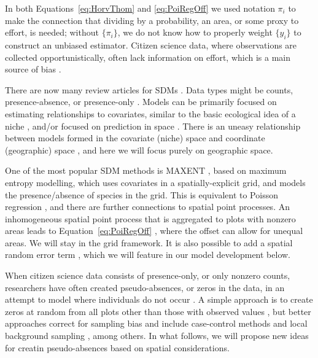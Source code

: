 \documentclass[11pt, titlepage]{article}
\begin{document}
\begin{spacing}{1.9}
\begin{flushleft}
In both Equations~\eqref{eq:HorvThom} and \eqref{eq:PoiRegOff} we used notation $\pi_{i}$ to make the connection that dividing by a probability, an area, or some proxy to effort, is needed; without $\{\pi_i\}$, we do not know how to properly weight $\{y_i\}$ to construct an unbiased estimator. Citizen science data, where observations are collected opportunistically, often lack information on effort, which is a main source of bias \citep{bird_statistical_2014}.

There are now many review articles for SDMs \citep[e.g.,][]{austin_species_2007,
elith_species_2009, hefley_hierarchical_2016,
robinson_systematic_2017, araujo_standards_2019}. Data types might be counts, presence-absence, or presence-only \citep{hefley_hierarchical_2016}. Models can be primarily focused on estimating relationships to covariates, similar to the basic ecological idea of a niche \citep{soberon_grinnellian_2007,elith_species_2009}, and/or focused on prediction in space \citep{austin_spatial_2002,elith_species_2009}.  There is an uneasy relationship between models formed in the covariate (niche) space and coordinate (geographic) space \citep{randin_are_2006}, and here we will focus purely on geographic space.

One of the most popular SDM methods is MAXENT \citep{phillips_maximum_2006}, based on maximum entropy modelling, which uses covariates in a spatially-explicit grid, and models the presence/absence of species in the grid. This is equivalent to Poisson regression \citep{renner_equivalence_2013}, and there are further connections to spatial point processes. An inhomogeneous spatial point process that is aggregated to plots with nonzero areas leads to Equation~\ref{eq:PoiRegOff} \citep{warton_poisson_2010}, where the offset can allow for unequal areas.  We will stay in the grid framework. It is also possible to add a spatial random error term \citep{guelat_effects_2018}, which we will feature in our model development below.

When citizen science data consists of presence-only, or only nonzero counts, researchers have often created pseudo-absences, or zeros in the data, in an attempt to model where individuals do not occur \citep{pearce_modelling_2006, conn_extrapolating_2015}. A simple approach is to create zeros at random from all plots other than those with observed values \citep{stockwell_controlling_2002}, but better approaches correct for sampling bias \citep{phillips_sample_2009, conn_confronting_2017} and include case-control methods \citep{fithian_local_2014} and local background sampling \citep{daniel_efficient_2020}, among others. In what follows, we will propose new ideas for creatin pseudo-absences based on spatial considerations.


\end{flushleft}
\end{spacing}
\end{document}
